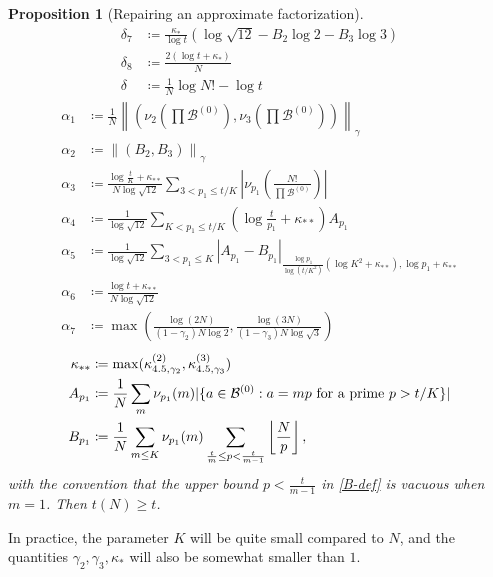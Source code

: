 \documentclass[12pt,a4paper,reqno]{amsart}
\numberwithin{equation}{section}
\theoremstyle{plain}
\newtheorem{proposition}[theorem]{Proposition}
\theoremstyle{definition}
\newcommand\tuple{{\mathcal B}}
\begin{document}
\begin{proposition}[Repairing an approximate factorization]
\begin{align}
\delta_7 &\coloneqq \frac{\kappa_*}{\log t} \left( \log \sqrt{12} - B_2 \log 2 - B_3 \log 3\right)\label{delta7-def}  \\
\delta_8 &\coloneqq \frac{2(\log t + \kappa_*)}{N} \label{delta8-def}\\
\delta &\coloneqq \frac{1}{N} \log N! - \log t\label{delta-def}  
\end{align}
\begin{align}
\alpha_1 &\coloneqq \frac{1}{N} \left\| \left( \nu_{2}\left(\prod \tuple^{(0)}\right), \nu_{3}\left(\prod \tuple^{(0)}\right)\right) \right\|_\gamma \label{alpha1-def}  \\
\alpha_2 &\coloneqq \left\| (B_2, B_3) \right\|_\gamma \label{alpha2-def}  \\
\alpha_3 &\coloneqq \frac{\log \frac{t}{K} + \kappa_{**}}{N\log \sqrt{12}} \sum_{3 < p_1 \leq t/K} \left|\nu_{p_1}\left( \frac{N!}{\prod \tuple^{(0)}} \right)\right| \label{alpha3-def}  \\
\alpha_4 &\coloneqq \frac{1}{\log \sqrt{12}} \sum_{K < p_1 \leq t/K} \left(\log \frac{t}{p_1} + \kappa_{**}\right) A_{p_1} \label{alpha4-def}  \\
\alpha_5 &\coloneqq \frac{1}{\log \sqrt{12}} \sum_{3 < p_1 \leq K} \left|A_{p_1} - B_{p_1}\right|_{\frac{\log p_1}{\log(t/K^2)} (\log K^2 + \kappa_{**}), \log p_1 + \kappa_{**}} \label{alpha5-def}  \\
\alpha_6 &\coloneqq \frac{\log t + \kappa_{**}}{N\log \sqrt{12}}  \label{alpha6-def}  \\
\alpha_7 &\coloneqq \max\left( \frac{\log(2N)}{(1-\gamma_2)N\log 2},  \frac{\log(3N)}{(1-\gamma_3)N\log \sqrt{3}}\right)\label{alpha7-def}  
\end{align}
\begin{align}
\kappa_{**} &\coloneqq \max(\kappa^{(2)}_{4.5, \gamma_2}, \kappa^{(3)}_{4.5, \gamma_3}) \label{kappastar-def}  \\
A_{p_1} &\coloneqq \frac{1}{N} \sum_m \nu_{p_1}(m) | \{ a \in \tuple^{(0)}: a = mp \hbox{ for a prime } p > t/K \}| \label{A-def} \\
B_{p_1} &\coloneqq \frac{1}{N} \sum_{m \leq K} \nu_{p_1}(m) \sum_{\frac{t}{m} \leq p < \frac{t}{m-1}} \left \lfloor \frac{N}{p} \right\rfloor,\label{B-def} 
\end{align}
with the convention that the upper bound $p < \frac{t}{m-1}$ in \eqref{B-def} is vacuous when $m=1$.  Then $t(N) \geq t$.
\end{proposition}

In practice, the parameter $K$ will be quite small compared to $N$, and the quantities $\gamma_2, \gamma_3, \kappa_{*}$ will also be somewhat smaller than $1$.
\end{document}
